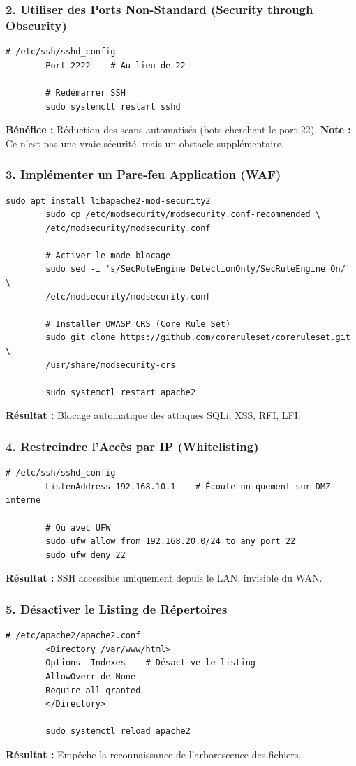 \documentclass[12pt,a4paper,openany]{report}
\begin{document}
	\subsubsection{2. Utiliser des Ports Non-Standard (Security through Obscurity)}
	\begin{lstlisting}[caption=Changement du port SSH]
		# /etc/ssh/sshd_config
		Port 2222    # Au lieu de 22
		
		# Redémarrer SSH
		sudo systemctl restart sshd
	\end{lstlisting}
	\textbf{Bénéfice :} Réduction des scans automatisés (bots cherchent le port 22). \textbf{Note :} Ce n'est pas une vraie sécurité, mais un obstacle supplémentaire.
	
	\subsubsection{3. Implémenter un Pare-feu Application (WAF)}
	\begin{lstlisting}[caption=Installation de ModSecurity avec Apache]
		sudo apt install libapache2-mod-security2
		sudo cp /etc/modsecurity/modsecurity.conf-recommended \
		/etc/modsecurity/modsecurity.conf
		
		# Activer le mode blocage
		sudo sed -i 's/SecRuleEngine DetectionOnly/SecRuleEngine On/' \
		/etc/modsecurity/modsecurity.conf
		
		# Installer OWASP CRS (Core Rule Set)
		sudo git clone https://github.com/coreruleset/coreruleset.git \
		/usr/share/modsecurity-crs
		
		sudo systemctl restart apache2
	\end{lstlisting}
	\textbf{Résultat :} Blocage automatique des attaques SQLi, XSS, RFI, LFI.
	
	\subsubsection{4. Restreindre l'Accès par IP (Whitelisting)}
	\begin{lstlisting}[caption=Restriction SSH aux IPs administrateur]
		# /etc/ssh/sshd_config
		ListenAddress 192.168.10.1    # Écoute uniquement sur DMZ interne
		
		# Ou avec UFW
		sudo ufw allow from 192.168.20.0/24 to any port 22
		sudo ufw deny 22
	\end{lstlisting}
	\textbf{Résultat :} SSH accessible uniquement depuis le LAN, invisible du WAN.
	
	\subsubsection{5. Désactiver le Listing de Répertoires}
	\begin{lstlisting}[caption=Configuration Apache pour masquer la structure]
		# /etc/apache2/apache2.conf
		<Directory /var/www/html>
		Options -Indexes    # Désactive le listing
		AllowOverride None
		Require all granted
		</Directory>
		
		sudo systemctl reload apache2
	\end{lstlisting}
	\textbf{Résultat :} Empêche la reconnaissance de l'arborescence des fichiers.
	
\end{document}
